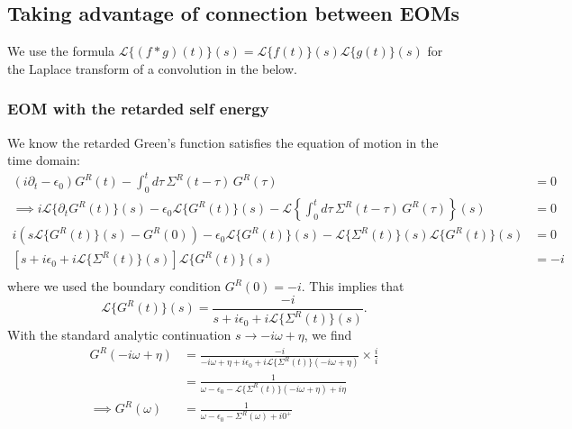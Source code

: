 \subsection{Taking advantage of connection between EOMs}
We use the formula $\mathcal{L}\{(f*g)(t)\}(s)=\mathcal{L}\{f(t)\}(s) \mathcal{L}\{g(t)\}(s)$ for the Laplace transform of a convolution in the below.
\subsubsection{EOM with the retarded self energy}
We know the retarded Green's function satisfies the equation of motion in the time domain:
\begin{align}
    (i\partial_t - \epsilon_0) G^R(t) - \int_0^t d\tau\, \Sigma^R(t - \tau)\, G^R(\tau) &= 0 \label{eq:eom_retarded} \\
\implies i\mathcal{L}\{ \partial_t G^R(t)\}(s) - \epsilon_0 \mathcal{L} \{ G^R(t)\}(s) - \mathcal{L}\left\{\int_0^t d\tau\, \Sigma^R(t - \tau)\, G^R(\tau)\right\}(s) &= 0 \\
 i \left( s \mathcal{L} \{ G^R(t)\}(s) -G^R(0)\right)- \epsilon_0 \mathcal{L} \{ G^R(t)\}(s) - \mathcal{L}\{\Sigma^R(t)\}(s) \mathcal{L}\{G^R(t)\}(s) &= 0\\
\left[s + i\epsilon_0 + i\mathcal{L}\{\Sigma^R(t)\}(s)\right] \mathcal{L}\{G^R(t)\}(s) &= -i \\
\end{align}
where we used the boundary condition $G^R(0) = -i$.
This implies that
\begin{equation}
    \mathcal{L}\{G^R(t)\}(s) = \frac{-i}{s + i\epsilon_0 + i\mathcal{L}\{\Sigma^R(t)\}(s)}.
\end{equation}
With the standard analytic continuation $s \rightarrow -i\omega + \eta$, we find
\begin{align}
    G^R(-i\omega + \eta) &= \frac{-i}{-i\omega + \eta + i\epsilon_0 + i\mathcal{L}\{\Sigma^R(t)\}(-i\omega + \eta)} \times \frac{i}{i}\\
    &= \frac{1}{\omega - \epsilon_0 - \mathcal{L}\{\Sigma^R(t)\}(-i\omega + \eta) + i\eta} \\
   \implies  G^R(\omega) &= \frac{1}{\omega - \epsilon_0 - \Sigma^R(\omega) + i0^+}
\end{align}
